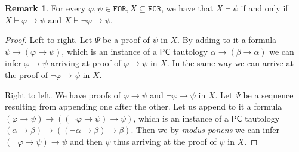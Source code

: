 \documentclass{article}
\theoremstyle{definition}
\theoremstyle{definition}
\theoremstyle{definition}
\newtheorem{remark}{Remark}[section]
\newcommand*{\ra}{\rightarrow}
\newcommand*{\FOR}{\texttt{FOR}}
\newcommand{\PC}{$\mathsf{PC}$\xspace}
\begin{document}
\begin{remark}
    \label{phi_not_phi_ra_psi}
    For every $\varphi, \psi \in \FOR, X \subseteq \FOR$, we have that $X \vdash \psi$ if and only if $X \vdash \varphi \ra \psi$ and $X \vdash \lnot \varphi \ra \psi$.

    \begin{proof}
        Left to right. Let $\Psi$ be a proof of $\psi$ in $X$. By adding to it a formula $\psi \ra (\varphi \ra \psi)$, which is an instance of a \PC tautology $\alpha \ra (\beta \ra \alpha)$ we can infer $\varphi \ra \psi$ arriving at proof of $\varphi \ra \psi$ in $X$. In the same way we can arrive at the proof of $\lnot \varphi \ra \psi$ in $X$.

        Right to left. We have proofs of $\varphi \ra \psi$ and $\lnot \varphi \ra
            \psi$ in $X$. Let $\Psi$ be a sequence resulting from appending one after the
        other. Let us append to it a formula $(\varphi \ra \psi) \ra ((\lnot \varphi
            \ra \psi) \ra \psi)$, which is an instance of a \PC tautology $(\alpha \ra \beta)
            \ra ((\lnot \alpha \ra \beta) \ra \beta)$. Then we by \emph{modus ponens} we
        can infer $(\lnot \varphi \ra \psi) \ra \psi$ and then $\psi$ thus arriving at
        the proof of $\psi$ in $X$.
    \end{proof}
\end{remark}
\end{document}
